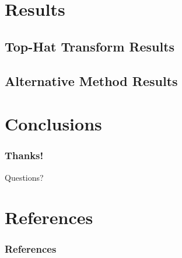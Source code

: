 \documentclass{beamer}
\newcommand{\linespace}{\vskip 0.25cm}
\begin{document}
\section[Results]{Results}

\subsection[Top-Hat Transform Results]{Top-Hat Transform Results}

\subsection[Alternative Method Results]{Alternative Method Results}

\section[Conclusions]{Conclusions}

\begin{frame}
	\frametitle{Thanks!}
		
	\linespace
	\linespace
	
	
	\linespace
	\linespace
	
	\begin{center}
	{\huge Questions?}
	\end{center}
\end{frame}

\section*{References}

\begin{frame} 
	\frametitle{References} 
	
	\begin{thebibliography}{lskdjf}
	\end{thebibliography}
\end{frame} 
\end{document}
